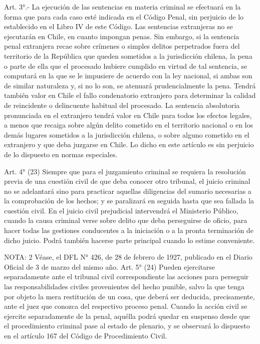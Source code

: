     Art. 3°.- La ejecución de las sentencias en materia criminal se efectuará en la forma que para cada caso esté indicada en el Código Penal, sin perjuicio de lo  establecido en el Libro IV de este Código.
    Las sentencias extranjeras no se ejecutarán en Chile, en cuanto impongan penas.
    Sin embargo, si la sentencia penal extranjera recae sobre crímenes o simples delitos perpetrados fuera del territorio de la República que queden sometidos a la jurisdicción chilena, la pena o parte de ella que el procesado hubiere cumplido en virtud de tal sentencia, se computará en la que se le impusiere de acuerdo con la ley nacional, si ambas son de similar naturaleza y, si no lo son, se atenuará prudencialmente la pena.
    Tendrá también valor en Chile el fallo condenatorio extranjero para determinar la calidad de reincidente o delincuente habitual del procesado.
    La sentencia absolutoria pronunciada en el extranjero tendrá valor en Chile para todos los efectos legales, a menos que recaiga sobre algún delito cometido en el territorio nacional o en los demás lugares sometidos a la jurisdicción chilena, o sobre alguno  cometido en el extranjero y que deba juzgarse en Chile.
    Lo dicho en este artículo es sin perjuicio de lo dispuesto en normas especiales.


    Art. 4° (23) Siempre que para el juzgamiento criminal se requiera la resolución previa de una cuestión civil de que deba conocer otro tribunal, el juicio criminal no se adelantará sino para practicar aquellas diligencias del sumario necesarias a la comprobación de los hechos; y se paralizará en seguida hasta que sea fallada la cuestión civil.
    En el juicio civil prejudicial intervendrá el Ministerio Público, cuando la causa criminal verse sobre delito que deba perseguirse de oficio, para hacer todas las gestiones conducentes a la iniciación o a la pronta terminación de dicho juicio.
    Podrá también hacerse parte principal cuando lo estime conveniente.

NOTA:  2
    Véase, el DFL N° 426, de 28 de febrero de 1927, publicado en el Diario Oficial de 3 de marzo del mismo año.
    Art. 5° (24) Pueden ejercitarse separadamente ante el tribunal civil correspondiente las acciones para perseguir las responsabilidades civiles provenientes del hecho punible, salvo la que tenga por objeto la mera restitución de un cosa, que deberá ser deducida, precisamente, ante el juez que conozca del respectivo proceso penal.
    Cuando la acción civil se ejercite separadamente de la penal, aquélla podrá quedar en suspenso desde que el procedimiento criminal pase al estado de plenario, y se observará lo dispuesto en el artículo 167 del Código de Procedimiento Civil.

